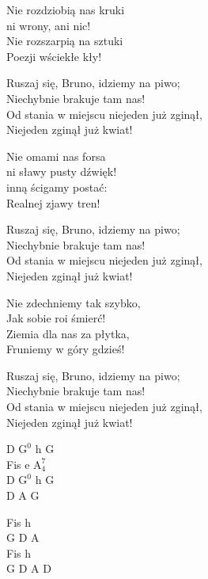 \begin{text}
    Nie rozdziobią nas kruki\\
    ni wrony, ani nic!\\
    Nie rozszarpią na sztuki\\
    Poezji wściekłe kły!

    Ruszaj się, Bruno, idziemy na piwo;\\
    Niechybnie brakuje tam nas!\\
    Od stania w miejscu niejeden już zginął,\\
    Niejeden zginął już kwiat!

    Nie omami nas forsa\\
    ni sławy pusty dźwięk!\\
    inną ścigamy postać:\\
    Realnej zjawy tren!

    Ruszaj się, Bruno, idziemy na piwo;\\
    Niechybnie brakuje tam nas!\\
    Od stania w miejscu niejeden już zginął,\\
    Niejeden zginął już kwiat!

    Nie zdechniemy tak szybko,\\
    Jak sobie roi śmierć!\\
    Ziemia dla nas za płytka,\\
    Fruniemy w góry gdzieś!

    Ruszaj się, Bruno, idziemy na piwo;\\
    Niechybnie brakuje tam nas!\\
    Od stania w miejscu niejeden już zginął,\\
    Niejeden zginął już kwiat!
\end{text}
\begin{chord}
    D $\mathrm{G^{0}}$ h G\\
    Fis e $\mathrm{A_{4}^{7}}$\\
    D $\mathrm{G^{0}}$ h G\\
    D A G

    Fis h\\
    G D A\\
    Fis h\\
    G D A D
\end{chord}
